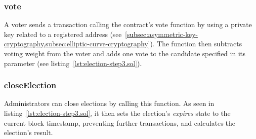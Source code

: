\subsubsection{vote}

A voter sends a transaction calling the contract's vote function by using a private key related to a registered address (see~\cref{subsec:asymmetric-key-cryptography,subsec:elliptic-curve-cryptography}).
The function then subtracts voting weight from the voter and adds one vote to the candidate specified in its parameter (see listing~\ref{lst:election-step3.sol}).

\subsubsection{closeElection}

Administrators can close elections by calling this function.
As seen in listing~\ref{lst:election-step3.sol}, it then sets the election's \emph{expires} state to the current block timestamp, preventing further transactions, and calculates the election's result.





